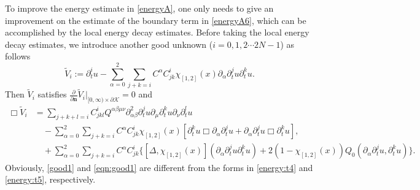 \documentclass[11pt,twoside]{article}
\def\cK{\mathcal K}
\def\ds{\displaystyle}
\def\p{\partial}
\def\bn{\mathbf{n}}
\theoremstyle{plain}
\theoremstyle{definition}
\numberwithin{equation}{section}
\begin{document}
To improve the energy estimate in \eqref{energyA}, one only needs to give an improvement on the estimate
of the boundary term in \eqref{energyA6}, which can be accomplished by the local energy decay estimates.
Before taking the local energy decay estimates, we introduce another good unknown ($i=0,1,2\cdots2N-1$)
as follows
\begin{equation}\label{good1}
\tilde V_i:=\p_t^iu-\sum_{\alpha=0}^2\sum_{j+k=i}C^{\alpha}C^i_{jk}\chi_{[1,2]}(x)\p_{\alpha}\p_t^ju\p_t^ku.
\end{equation}
Then $\tilde V_i$ satisfies $\ds\frac{\p}{\p\bn}\tilde V_i|_{[0,\infty)\times\p\cK}=0$ and
\begin{equation}\label{eqn:good1}
\begin{split}
\Box\tilde V_i&=\sum_{j+k+l=i}C^i_{jkl}Q^{\alpha\beta\mu\nu}\p^2_{\alpha\beta}\p_t^ju\p_{\mu}\p_t^ku\p_{\nu}\p_t^lu\\
&\quad-\sum_{\alpha=0}^2\sum_{j+k=i}C^{\alpha}C^i_{jk}\chi_{[1,2]}(x)[\p_t^ku\Box\p_{\alpha}\p_t^ju+\p_{\alpha}\p_t^ju\Box\p_t^ku],\\
&\quad+\sum_{\alpha=0}^2\sum_{j+k=i}C^{\alpha}C^i_{jk}\Big\{[\Delta,\chi_{[1,2]}(x)](\p_{\alpha}\p_t^ju\p_t^ku)
+2(1-\chi_{[1,2]}(x))Q_0(\p_{\alpha}\p_t^ju,\p_t^ku)\Big\}.
\end{split}
\end{equation}
Obviously, \eqref{good1} and \eqref{eqn:good1} are different from the forms in \eqref{energy:t4} and \eqref{energy:t5}, respectively.
\end{document}
